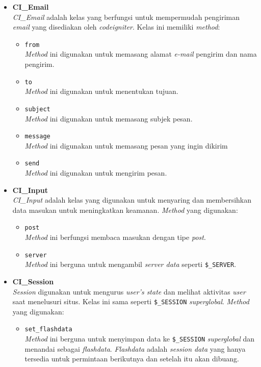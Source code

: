 \documentclass[a4paper,twoside]{article}
\begin{document}
\begin{enumerate}
\begin{enumerate}
\begin{itemize}
			\item \textbf{CI\_Email} \\
			\textit{CI\_Email} adalah kelas yang berfungsi untuk mempermudah pengiriman \textit{email} yang disediakan oleh \textit{codeigniter}. Kelas ini memiliki \textit{method}: 
			\begin{itemize}
				\item \texttt{from} \\
				\textit{Method} ini digunakan untuk memasang alamat \textit{e-mail} pengirim dan nama pengirim.
				\item \texttt{to} \\
				\textit{Method} ini digunakan untuk menentukan tujuan.
				\item \texttt{subject} \\
				\textit{Method} ini digunakan untuk memasang subjek pesan.
				\item \texttt{message} \\
				\textit{Method} ini digunakan untuk memasang pesan yang ingin dikirim
				\item \texttt{send} \\
				\textit{Method} ini digunakan untuk mengirim pesan.
			\end{itemize}
		\item \textbf{CI\_Input} \\ 
		\textit{CI\_Input} adalah kelas yang digunakan untuk menyaring dan membersihkan data masukan untuk meningkatkan keamanan. \textit{Method} yang digunakan:
		\begin{itemize}
			\item \texttt{post} \\
			\textit{Method} ini berfungsi membaca masukan dengan tipe \textit{post}.
			\item \texttt{server} \\
			\textit{Method} ini berguna untuk mengambil \textit{server data} seperti \texttt{\$\_SERVER}.
		\end{itemize}
		\item \textbf{CI\_Session} \\
		\textit{Session} digunakan untuk mengurus  \textit{user's state} dan melihat aktivitas \textit{user} saat menelusuri situs. Kelas ini sama seperti \texttt{\$\_SESSION} \textit{superglobal}. \textit{Method} yang digunakan:
		\begin{itemize}
			\item \texttt{set\_flashdata} \\
			\textit{Method} ini berguna untuk menyimpan data ke \texttt{\$\_SESSION} \textit{superglobal} dan menandai sebagai \textit{flashdata}. \textit{Flashdata} adalah \textit{session data} yang hanya tersedia untuk permintaan berikutnya dan setelah itu akan dibuang.
			

\end{itemize}
\end{itemize}
\end{enumerate}
\end{enumerate}
\end{document}
